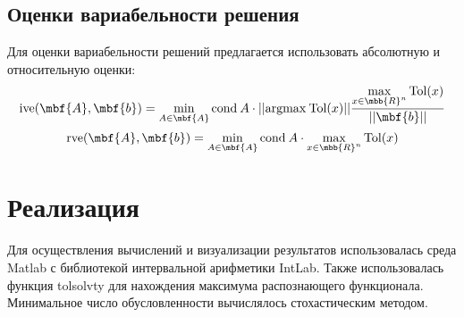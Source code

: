 \documentclass[a4paper]{article}
\begin{document}
\subsection{Оценки вариабельности решения}
Для оценки вариабельности решений предлагается использовать абсолютную и относительную оценки:
$$\mathrm{ive}(\mbf{A},\mbf{b})=\min\limits_{A\in\mbf{A}}\mathrm{cond}\:A\cdot||\mathrm{argmax}\:\mathrm{Tol}(x)||\frac{\max\limits_{x\in\mbb{R}^n}\mathrm{Tol}(x)}{||\mbf{b}||}$$
$$\mathrm{rve}(\mbf{A},\mbf{b})=\min\limits_{A\in\mbf{A}}\mathrm{cond}\:A\cdot\max\limits_{x\in\mbb{R}^n}\mathrm{Tol}(x)$$
\section{Реализация}
Для осуществления вычислений и визуализации результатов использовалась среда Matlab с библиотекой интервальной арифметики IntLab. Также использовалась функция tolsolvty для нахождения максимума распознающего функционала. Минимальное число обусловленности вычислялось стохастическим методом. 
\end{document}
